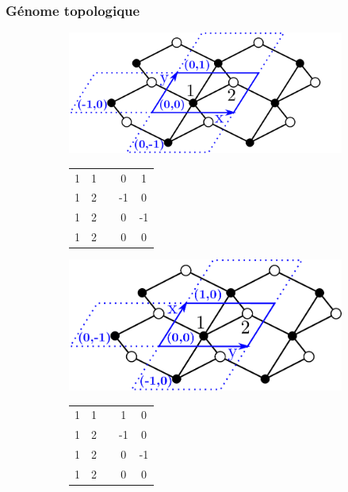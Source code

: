 \documentclass[thesis]{subfiles}
\begin{document}
\begin{otherlanguage}{french}
\subsubsection{Génome topologique}

\begin{figure}[t]
	\begin{subfigure}[b]{0.35\linewidth}
		\hspace{-1.5em}\includegraphics[width=0.96\linewidth]{figures/topology/cells_ref.pdf}
		
		\centering\begin{tabular}{ccccc}
			1&1&&0&1\\
			1&2&&-1&0\\
			1&2&&0&-1\\
			1&2&&0&0
		\end{tabular}
		
	\end{subfigure}%
	\begin{subfigure}[b]{0.35\linewidth}
		\hspace{-1.5em}\includegraphics[width=0.9\linewidth]{figures/topology/cells_xy.pdf}
		
		\centering\begin{tabular}{ccccc}
			1&1&&1&0\\
			1&2&&-1&0\\
			1&2&&0&-1\\
			1&2&&0&0
		\end{tabular}
		

\end{subfigure}
\end{figure}
\end{otherlanguage}
\end{document}
